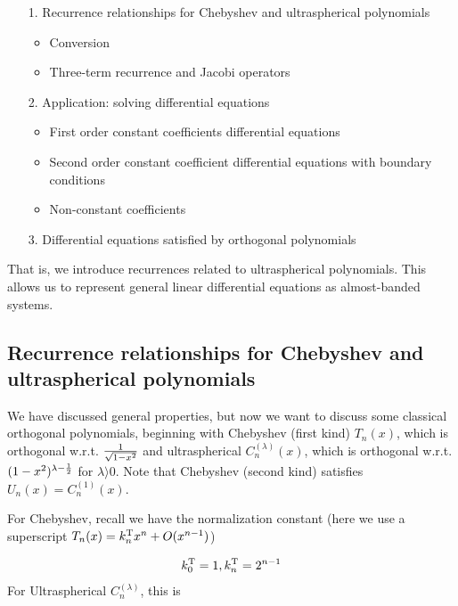 \documentclass[12pt,a4paper]{article}
\begin{document}
\begin{itemize}
\item[1. ] Recurrence relationships for Chebyshev and ultraspherical polynomials

\begin{itemize}
\item Conversion


\item Three-term recurrence and Jacobi operators

\end{itemize}

\item[2. ] Application: solving differential equations

\begin{itemize}
\item First order constant coefficients differential equations


\item Second order constant coefficient differential equations with boundary conditions


\item Non-constant coefficients

\end{itemize}

\item[3. ] Differential equations satisfied by orthogonal polynomials

\end{itemize}
That is, we introduce recurrences related to ultraspherical polynomials. This allows us to represent general linear differential equations as almost-banded systems.

\subsection{Recurrence relationships for Chebyshev and ultraspherical polynomials}
We have discussed general properties, but now we want to discuss some classical orthogonal polynomials, beginning with Chebyshev (first kind) $T_n(x)$, which is orthogonal w.r.t. $1\over \sqrt{1-x^2}$ and ultraspherical $C_n^{(\lambda)}(x)$, which is orthogonal w.r.t. $(1-x^2)^{\lambda - {1\over 2}}$ for $\lambda \rangle 0$. Note that Chebyshev (second kind) satisfies $U_n(x) = C_n^{(1)}(x)$.

For Chebyshev, recall we have the normalization constant (here we use a superscript $T_n(x) = k_n^{\rm T} x^n + O(x^{n-1})$)

\[
k_0^{\rm T} = 1, k_n^{\rm T} = 2^{n-1}
\]
For Ultraspherical $C_n^{(\lambda)}$, this is
\end{document}
